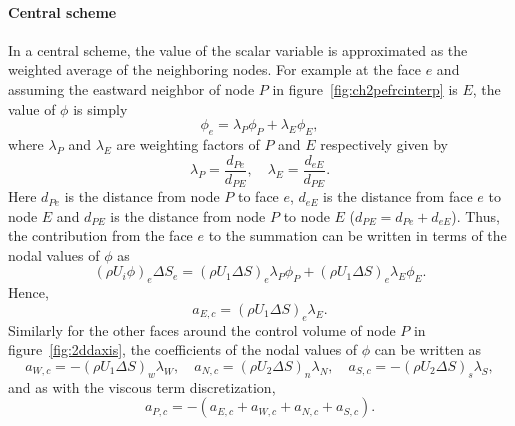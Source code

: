 \paragraph{Central scheme}
In a central scheme, the value of the scalar variable is approximated as the weighted average of the neighboring nodes. For example at the face $e$ and assuming the eastward neighbor of node $P$ in figure~\ref{fig:ch2pefrcinterp} is $E$, the value of $\phi$ is simply
\begin{equation}
\phi_e = \lambda_P \phi_P + \lambda_E \phi_E,
\end{equation}
where $\lambda_P$ and $\lambda_E$ are weighting factors of $P$ and $E$ respectively given by
\begin{equation}
\lambda_P = \frac{d_{Pe}}{d_{PE}}, \quad \lambda_E = \frac{d_{eE}}{d_{PE}}.
\end{equation} 
Here $d_{Pe}$ is the distance from node $P$ to face $e$, $d_{eE}$ is the distance from face $e$ to node $E$ and $d_{PE}$ is the distance from node $P$ to node $E$ ($d_{PE} = d_{Pe} + d_{eE}$). Thus, the contribution from the face $e$ to the summation can be written in terms of the nodal values of $\phi$ as 
\begin{equation}
\left(\rho U_i \phi \right)_e \Delta S_e = (\rho U_1 \Delta S)_e \lambda_P \phi_P + (\rho U_1 \Delta S)_e\lambda_E \phi_E.
\end{equation}
Hence,
\begin{equation*}
a_{E,c} = (\rho U_1 \Delta S)_e\lambda_E.
\end{equation*}
Similarly for the other faces around the control volume of node $P$ in figure~\ref{fig:2ddaxis}, the coefficients of the nodal values of $\phi$ can be written as
\begin{equation*}
a_{W,c} = -(\rho U_1 \Delta S)_w\lambda_W, \quad a_{N,c} = (\rho U_2 \Delta S)_n\lambda_N, \quad a_{S,c} = -(\rho U_2 \Delta S)_s\lambda_S,
\end{equation*}
and as with the viscous term discretization,
\begin{equation*}
a_{P,c} = -(a_{E,c} + a_{W,c} + a_{N,c} + a_{S,c}).
\end{equation*}

